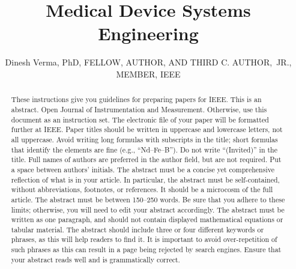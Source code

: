 \documentclass{IEEEoj}
\begin{document}

\title{Medical Device Systems Engineering}

\author{Dinesh Verma, PhD, FELLOW,
AUTHOR, AND THIRD C. AUTHOR,~JR.,
MEMBER, IEEE}






\begin{abstract}
These instructions give you guidelines for preparing papers for IEEE. This is an abstract.
Open Journal of Instrumentation and Measurement.
 Otherwise, use this document as an instruction set. The electronic file of your paper will be formatted further at IEEE. Paper titles should be written in uppercase and lowercase letters, not all uppercase. Avoid writing long formulas with subscripts in the title; short formulas that identify the elements are fine (e.g., ``Nd--Fe--B''). Do not write ``(Invited)'' in the title. Full names of authors are preferred in the author field, but are not required. Put a space between authors' initials. The abstract must be a concise yet comprehensive reflection of what is in your article. In particular, the abstract must be self-contained, without abbreviations, footnotes, or references. It should be a microcosm of the full article. The abstract must be between 150--250 words. Be sure that you adhere to these limits; otherwise, you will need to edit your abstract accordingly. The abstract must be written as one paragraph, and should not contain displayed mathematical equations or tabular material. The abstract should include three or four different keywords or phrases, as this will help readers to find it. It is important to avoid over-repetition of such phrases as this can result in a page being rejected by search engines. Ensure that your abstract reads well and is grammatically correct.
\end{abstract}
\end{document}
